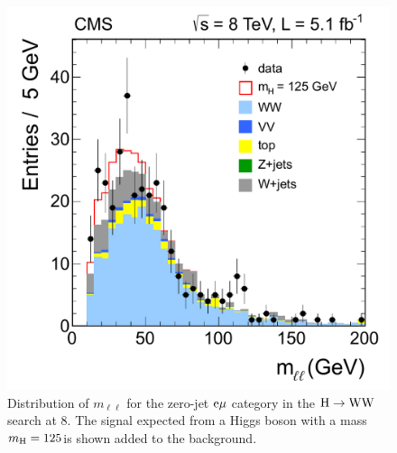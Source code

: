 \documentclass[11pt,twoside,a4paper,cmspaper,final]{cms-tdr}
\begin{document}
\begin{figure}[htbp]
  \begin{center}
    \includegraphics[width=\cmsFigWideWidth]{mll_of_final}
    \caption{Distribution of $m_{\ell\ell}$ for the
    zero-jet $\mathrm{e}{\mu}$ category in the $\mathrm{H}\to\mathrm{W}\mathrm{W}$ search
    at 8\TeV. The signal expected from a Higgs boson with a mass $m_{\mathrm{H}}
    = 125$\GeV is shown added to the background.
}
    \label{fig:WWdilep}
  \end{center}
\end{figure}
\end{document}
